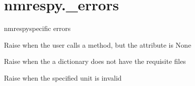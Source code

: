 \documentclass[letterpaper,10pt,english]{sphinxmanual}
\begin{document}
\section{nmrespy.\_errors}
\label{\detokenize{references/errors:module-nmrespy._errors}}\label{\detokenize{references/errors:nmrespy-errors}}\label{\detokenize{references/errors::doc}}
\sphinxAtStartPar
nmrespy\sphinxhyphen{}specific errors

\begin{fulllineitems}
\label{\detokenize{references/errors:nmrespy._errors.AttributeIsNoneError}}
\sphinxAtStartPar
Raise when the user calls a  method, but the attribute
is None

\end{fulllineitems}


\begin{fulllineitems}
\label{\detokenize{references/errors:nmrespy._errors.InvalidDirectoryError}}
\sphinxAtStartPar
Raise when the a dictionary does not have the requisite files

\end{fulllineitems}


\begin{fulllineitems}
\label{\detokenize{references/errors:nmrespy._errors.InvalidUnitError}}
\sphinxAtStartPar
Raise when the specified unit is invalid

\end{fulllineitems}

\end{document}
